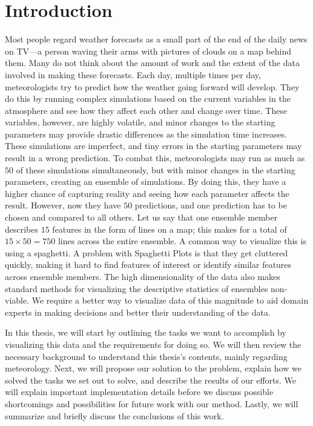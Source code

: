 \chapter{Introduction}
Most people regard weather forecasts as a small part of the end of the daily news on TV—a person waving their arms with pictures of clouds on a map behind them. Many do not think about the amount of work and the extent of the data involved in making these forecasts. 
Each day, multiple times per day, meteorologists try to predict how the weather going forward will develop. They do this by running complex simulations based on the current variables in the atmosphere and see how they affect each other and change over time. These variables, however, are highly volatile, and minor changes to the starting parameters may provide drastic differences as the simulation time increases. These simulations are imperfect, and tiny errors in the starting parameters may result in a wrong prediction. To combat this, meteorologists may run as much as $50$ of these simulations simultaneously, but with minor changes in the starting parameters, creating an ensemble of simulations. By doing this, they have a higher chance of capturing reality and seeing how each parameter affects the result. However, now they have $50$ predictions, and one prediction has to be chosen and compared to all others. Let us say that one ensemble member describes $15$ features in the form of lines on a map; this makes for a total of $15 \times 50 = 750$ lines across the entire ensemble. A common way to visualize this is using a \gls{spaghetti}. A problem with Spaghetti Plots is that they get cluttered quickly, making it hard to find features of interest or identify similar features across ensemble members. The high dimensionality of the data also makes standard methods for visualizing the descriptive statistics of ensembles non-viable. We require a better way to visualize data of this magnitude to aid domain experts in making decisions and better their understanding of the data.

In this thesis, we will start by outlining the tasks we want to accomplish by visualizing this data and the requirements for doing so. We will then review the necessary background to understand this thesis's contents, mainly regarding meteorology. Next, we will propose our solution to the problem, explain how we solved the tasks we set out to solve, and describe the results of our efforts. We will explain important implementation details before we discuss possible shortcomings and possibilities for future work with our method. Lastly, we will summarize and briefly discuss the conclusions of this work. 

